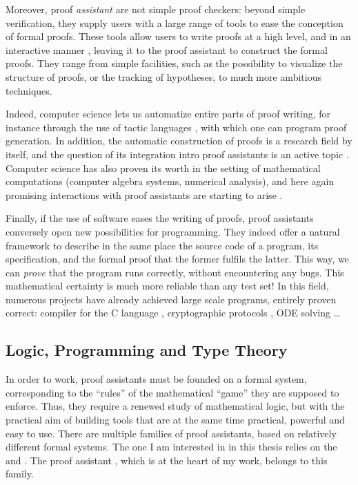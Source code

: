 Moreover, proof \emph{assistant} are not simple proof checkers: beyond simple verification,
they supply users with a large range of tools to ease the conception of
formal proofs. These tools allow users to write proofs at a
high level, and in an interactive manner%
,
leaving it to the proof assistant to construct the formal proofs.
They range from simple facilities, such as the possibility to visualize the structure
of proofs, or the tracking of hypotheses, to much more ambitious techniques.

Indeed, computer science lets us automatize entire parts of
proof writing, for instance through the use of tactic languages ,
with which one can program proof generation.
In addition, the automatic construction of proofs is a research field by itself,
and the question of its integration intro proof assistants is an active topic
. Computer science has also proven its worth in the
setting of mathematical computations (computer algebra systems, numerical analysis),
and here again promising interactions with proof assistants are starting to arise
.

Finally, if the use of software eases the writing of proofs, proof assistants conversely
open new possibilities for programming. They indeed offer a natural framework to describe in
the same place the source code of a program, its specification, and the formal proof that the
former fulfils the latter. This way, we can \emph{prove} that the program runs correctly,
without encountering any bugs.
This mathematical certainty is much more reliable than any test set!
In this field, numerous projects have already achieved large scale programs, entirely proven
correct: compiler for the C language , cryptographic protocols , ODE solving …

\subsection{Logic, Programming and Type Theory}

In order to work, proof assistants must be founded on a formal system, corresponding to
the “rules” of the mathematical “game” they are supposed to enforce.
Thus, they require a renewed study of mathematical logic, but with the practical aim of
building tools that are at the same time practical, powerful and easy to use.
There are multiple families of proof assistants, based on relatively different formal systems.
The one I am interested in in this thesis relies on the 
and . The proof assistant 
, which is at the heart of my work, belongs to this family.

